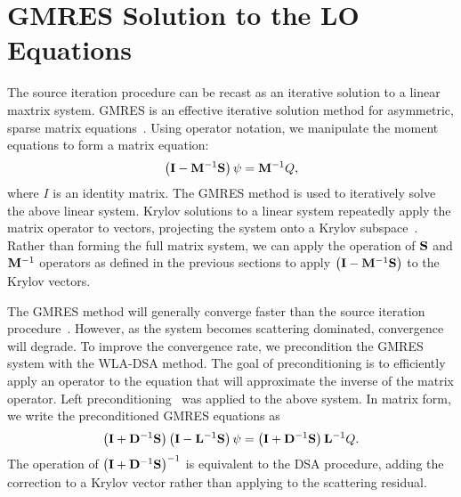 \section{GMRES Solution to the LO Equations}

The source iteration procedure can be recast as an iterative solution to a linear maxtrix
system.  GMRES is an effective iterative solution method for asymmetric, sparse matrix
equations~\cite{saad}.  Using operator notation, we manipulate
the moment equations to form a matrix equation:
\begin{equation}
    \left(\mathbf{I}  - \mathbf{M}^{-1}\mathbf{S}\right) \psi = \mathbf{M}^{-1} Q,
\end{equation}
where $I$ is an identity matrix.  The GMRES method is used to iteratively solve the above
linear system.  Krylov solutions to a linear system repeatedly apply the
matrix operator to vectors, projecting the system onto a Krylov
subspace~\cite{saad}.  Rather than forming the full matrix system, we can apply the
operation of $\mathbf{S}$ and $\mathbf{M}^{-1}$ operators as defined in the
previous sections to apply $\left(\mathbf{I}  - \mathbf{M}^{-1}\mathbf{S}\right)$ to the Krylov vectors. 

The GMRES method will generally converge faster than the source iteration
procedure~\cite{morel_dsa}.  However, as the system becomes scattering dominated,
convergence will degrade.  To improve the convergence rate, we precondition the GMRES
system with the WLA-DSA method.  The goal of preconditioning is to efficiently apply an
operator to the equation that will approximate the inverse of the matrix operator. Left
preconditioning~\cite{saad} was applied to the above system.  In matrix form, we write the preconditioned GMRES equations as
\begin{equation}
    \left(\mathbf{I} + \mathbf{D}^{-1} \mathbf{S}\right)\left(\mathbf{I} - \mathbf{L}^{-1} \mathbf{S} \right) \psi = \left( \mathbf{I} + \mathbf{D}^{-1}\mathbf{S}\right) \mathbf{L}^{-1} Q.
\end{equation}
The operation of $\left(\mathbf{I} + \mathbf{D}^{-1} \mathbf{S}\right)^{-1}$ is equivalent to the DSA
procedure, adding the correction to a Krylov vector rather than applying to the scattering
residual.

